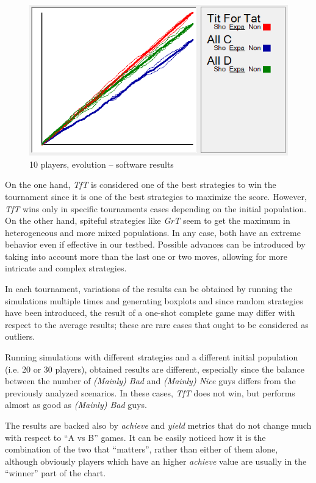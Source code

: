 \documentclass[journal,10pt,twoside]{IEEEtran}
\begin{document}
\begin{figure}[!ht]
    \centering
    \includegraphics[width=.8\columnwidth]{../img/ipdmp/ipdmp10-plot-det}
    \caption{10 players, evolution -- software results \cite{demosw}}
    \label{fig:ipdmp10evosw}
\end{figure}

On the one hand, \textit{TfT} is considered one of the best strategies to win the tournament since it is one of the best strategies to maximize the score. However, \textit{TfT} wins only in specific tournaments cases depending on the initial population. On the other hand, spiteful strategies like \textit{GrT} seem to get the maximum in heterogeneous and more mixed populations. In any case, both have an extreme behavior even if effective in our testbed. Possible advances can be introduced by taking into account more than the last one or two moves, allowing for more intricate and complex strategies.~\cite{mathieu2017}

In each tournament, variations of the results can be obtained by running the simulations multiple times and generating boxplots and since random strategies have been introduced, the result of a one-shot complete game may differ with respect to the average results; these are rare cases that ought to be considered as outliers.

Running simulations with different strategies and a different initial population (i.e. 20 or 30 players), obtained results are different, especially since the balance between the number of \textit{(Mainly) Bad} and \textit{(Mainly) Nice} guys differs from the previously analyzed scenarios. In these cases, \textit{TfT} does not win, but performs almost as good as \textit{(Mainly) Bad} guys.

The results are backed also by \textit{achieve} and \textit{yield} metrics that do not change much with respect to ``A vs B'' games.
It can be easily noticed how it is the combination of the two that ``matters'', rather than either of them alone, although obviously players which have an higher \textit{achieve} value are usually in the ``winner'' part of the chart.
\end{document}
